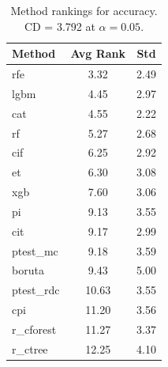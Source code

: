 \begin{table}[h]
\centering
\caption{Method rankings for accuracy. CD = 3.792 at $\alpha=0.05$.}
\label{tab:ranks_accuracy}
\begin{tabular}{lcc}
\toprule
Method & Avg Rank & Std \\
\midrule
rfe & 3.32 & 2.49 \\
lgbm & 4.45 & 2.97 \\
cat & 4.55 & 2.22 \\
rf & 5.27 & 2.68 \\
cif & 6.25 & 2.92 \\
et & 6.30 & 3.08 \\
xgb & 7.60 & 3.06 \\
pi & 9.13 & 3.55 \\
cit & 9.17 & 2.99 \\
ptest_mc & 9.18 & 3.59 \\
boruta & 9.43 & 5.00 \\
ptest_rdc & 10.63 & 3.55 \\
cpi & 11.20 & 3.56 \\
r_cforest & 11.27 & 3.37 \\
r_ctree & 12.25 & 4.10 \\
\bottomrule
\end{tabular}
\end{table}